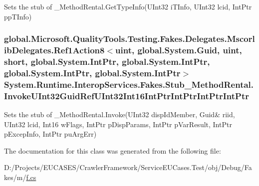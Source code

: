 Sets the stub of \-\_\-\-Method\-Rental.\-Get\-Type\-Info(\-U\-Int32 i\-T\-Info, U\-Int32 lcid, Int\-Ptr pp\-T\-Info)

\hypertarget{class_system_1_1_runtime_1_1_interop_services_1_1_fakes_1_1_stub___method_rental_aede0b226d1fbaa54b3d0bef0f9f40c0e}{
\subsubsection[{Invoke\-U\-Int32\-Guid\-Ref\-U\-Int32\-Int16\-Int\-Ptr\-Int\-Ptr\-Int\-Ptr\-Int\-Ptr}]{\setlength{\rightskip}{0pt plus 5cm}global.\-Microsoft.\-Quality\-Tools.\-Testing.\-Fakes.\-Delegates.\-Mscorlib\-Delegates.\-Ref1\-Action8$<$uint, global.\-System.\-Guid, uint, short, global.\-System.\-Int\-Ptr, global.\-System.\-Int\-Ptr, global.\-System.\-Int\-Ptr, global.\-System.\-Int\-Ptr$>$ System.\-Runtime.\-Interop\-Services.\-Fakes.\-Stub\-\_\-\-Method\-Rental.\-Invoke\-U\-Int32\-Guid\-Ref\-U\-Int32\-Int16\-Int\-Ptr\-Int\-Ptr\-Int\-Ptr\-Int\-Ptr}}\label{class_system_1_1_runtime_1_1_interop_services_1_1_fakes_1_1_stub___method_rental_aede0b226d1fbaa54b3d0bef0f9f40c0e}


Sets the stub of \-\_\-\-Method\-Rental.\-Invoke(U\-Int32 disp\-Id\-Member, Guid\& riid, U\-Int32 lcid, Int16 w\-Flags, Int\-Ptr p\-Disp\-Params, Int\-Ptr p\-Var\-Result, Int\-Ptr p\-Excep\-Info, Int\-Ptr pu\-Arg\-Err)



The documentation for this class was generated from the following file\-:\begin{DoxyCompactItemize}
\item 
D\-:/\-Projects/\-E\-U\-C\-A\-S\-E\-S/\-Crawler\-Framework/\-Service\-E\-U\-Cases.\-Test/obj/\-Debug/\-Fakes/m/\hyperlink{m_2f_8cs}{f.\-cs}\end{DoxyCompactItemize}

